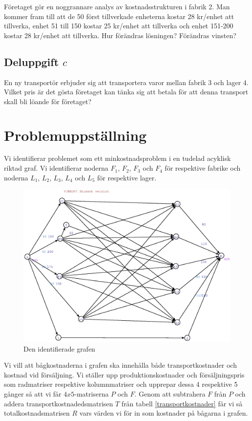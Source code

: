 \documentclass[titlepage, a4paper]{article}
\begin{document}
Företaget gör en noggrannare analys av kostnadsstrukturen i fabrik 2. Man kommer fram till att de 50 först tillverkade enheterna kostar 28 kr/enhet att tillverka, enhet 51 till 150 kostar 25 kr/enhet att tillverka och enhet 151-200 kostar 28 kr/enhet att tillverka. Hur förändras lösningen? Förändras vinsten?

\subsection{Deluppgift $c$}

En ny transportör erbjuder sig att transportera varor mellan fabrik 3 och lager 4. Vilket pris är det gösta företaget kan tänka sig att betala för att denna transport skall bli löande för företaget?

\section{Problemuppställning}

Vi identifierar problemet som ett minkostnadsproblem i en tudelad acyklisk riktad graf. Vi identifierar noderna $F_{1}$, $F_{2}$, $F_{3}$ och $F_{4}$ för respektive fabrike och noderna $L_{1}$, $L_{2}$, $L_{3}$, $L_{4}$ och $L_{5}$ för respektive lager.

\begin{figure}[h!]
    \centerline{\includegraphics[scale=0.65]{laborationsuppgift_13a_original.ps}}
    \caption{Den identifierade grafen}
\end{figure}

Vi vill att bågkostnaderna i grafen ska innehålla både transportkostnader och kostnad vid försäljning. Vi ställer upp produktionskostnader och försäljningspris som radmatriser respektive kolumnmatriser och upprepar dessa 4 respektive 5 gånger så att vi får $4x5$-matriserna $P$ och $F$. Genom att subtrahera $F$ från $P$ och addera transportkostnadedsmatrisen $T$ från tabell \ref{transportkostnader} får vi så totalkostnadsmatrisen $R$ vars värden vi för in som kostnader på bågarna i grafen.
\end{document}

